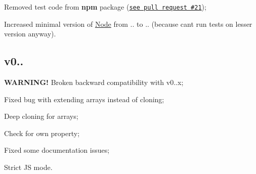 \begin{DoxyItemize}
\item Removed test code from {\bfseries npm} package (\href{https://github.com/unclechu/node-deep-extend/pull/21}{\tt see pull request \#21});
\item Increased minimal version of \mbox{\hyperlink{classNode}{Node}} from {..} to {..} (because can\textquotesingle{}t run tests on lesser version anyway).
\end{DoxyItemize}

\subsection*{v0.. }


\begin{DoxyItemize}
\item {\bfseries W\+A\+R\+N\+I\+N\+G!} Broken backward compatibility with {\ttfamily v0..\+x};
\item Fixed bug with extending arrays instead of cloning;
\item Deep cloning for arrays;
\item Check for own property;
\item Fixed some documentation issues;
\item Strict JS mode. 
\end{DoxyItemize}